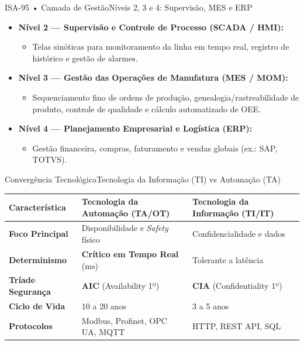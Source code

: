 \begin{senaiframe}{ISA-95 • Camada de Gestão}{Níveis 2, 3 e 4: Supervisão, MES e ERP}
  \begin{itemize}
    \item \textbf{Nível 2 — Supervisão e Controle de Processo (SCADA / HMI):}
      \begin{itemize}
        \item Telas sinóticas para monitoramento da linha em tempo real, registro de histórico e gestão de alarmes.
      \end{itemize}
    \item \textbf{Nível 3 — Gestão das Operações de Manufatura (MES / MOM):}
      \begin{itemize}
        \item Sequenciamento fino de ordens de produção, genealogia/rastreabilidade de produto, controle de qualidade e cálculo automatizado de OEE.
      \end{itemize}
    \item \textbf{Nível 4 — Planejamento Empresarial e Logística (ERP):}
      \begin{itemize}
        \item Gestão financeira, compras, faturamento e vendas globais (ex.: SAP, TOTVS).
      \end{itemize}
  \end{itemize}
\end{senaiframe}

\begin{senaiframe}{Convergência Tecnológica}{Tecnologia da Informação (TI) vs Automação (TA)}
  \small
  \begin{center}
    \begin{tabular}{|l|p{4.2cm}|p{4.2cm}|}
      \hline
      \textbf{Característica} & \textbf{Tecnologia da Automação (TA/OT)} & \textbf{Tecnologia da Informação (TI/IT)} \\ \hline
      \textbf{Foco Principal} & Disponibilidade e \textit{Safety} físico & Confidencialidade e dados \\ \hline
      \textbf{Determinismo} & \textbf{Crítico em Tempo Real} ($\text{ms}$) & Tolerante a latência \\ \hline
      \textbf{Tríade Segurança} & \textbf{AIC} (Availability 1º) & \textbf{CIA} (Confidentiality 1º) \\ \hline
      \textbf{Ciclo de Vida} & 10 a 20 anos & 3 a 5 anos \\ \hline
      \textbf{Protocolos} & Modbus, Profinet, OPC UA, MQTT & HTTP, REST API, SQL \\ \hline
    \end{tabular}
  \end{center}
\end{senaiframe}


